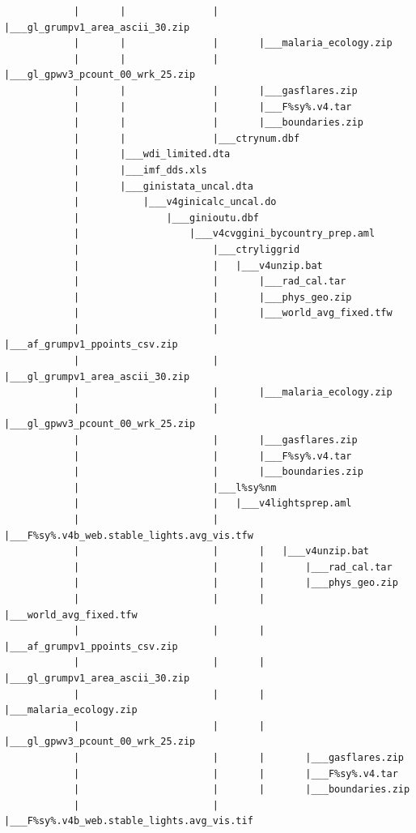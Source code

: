 \documentclass[
]{book}
\begin{document}
\begin{verbatim}
            |       |               |       |___gl_grumpv1_area_ascii_30.zip
            |       |               |       |___malaria_ecology.zip
            |       |               |       |___gl_gpwv3_pcount_00_wrk_25.zip
            |       |               |       |___gasflares.zip
            |       |               |       |___F%sy%.v4.tar
            |       |               |       |___boundaries.zip
            |       |               |___ctrynum.dbf
            |       |___wdi_limited.dta
            |       |___imf_dds.xls
            |       |___ginistata_uncal.dta
            |           |___v4ginicalc_uncal.do
            |               |___ginioutu.dbf
            |                   |___v4cvggini_bycountry_prep.aml
            |                       |___ctryliggrid
            |                       |   |___v4unzip.bat
            |                       |       |___rad_cal.tar
            |                       |       |___phys_geo.zip
            |                       |       |___world_avg_fixed.tfw
            |                       |       |___af_grumpv1_ppoints_csv.zip
            |                       |       |___gl_grumpv1_area_ascii_30.zip
            |                       |       |___malaria_ecology.zip
            |                       |       |___gl_gpwv3_pcount_00_wrk_25.zip
            |                       |       |___gasflares.zip
            |                       |       |___F%sy%.v4.tar
            |                       |       |___boundaries.zip
            |                       |___l%sy%nm
            |                       |   |___v4lightsprep.aml
            |                       |       |___F%sy%.v4b_web.stable_lights.avg_vis.tfw
            |                       |       |   |___v4unzip.bat
            |                       |       |       |___rad_cal.tar
            |                       |       |       |___phys_geo.zip
            |                       |       |       |___world_avg_fixed.tfw
            |                       |       |       |___af_grumpv1_ppoints_csv.zip
            |                       |       |       |___gl_grumpv1_area_ascii_30.zip
            |                       |       |       |___malaria_ecology.zip
            |                       |       |       |___gl_gpwv3_pcount_00_wrk_25.zip
            |                       |       |       |___gasflares.zip
            |                       |       |       |___F%sy%.v4.tar
            |                       |       |       |___boundaries.zip
            |                       |       |___F%sy%.v4b_web.stable_lights.avg_vis.tif

\end{verbatim}
\end{document}

